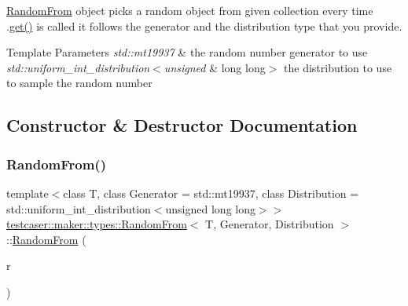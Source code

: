 \mbox{\hyperlink{structtestcaser_1_1maker_1_1types_1_1RandomFrom}{Random\+From}} object picks a random object from given collection every time .\mbox{\hyperlink{structtestcaser_1_1maker_1_1types_1_1RandomFrom_a6f72354c54f49a18de70b057a3b0f04b}{get()}} is called it follows the generator and the distribution type that you provide. 


\begin{DoxyTemplParams}{Template Parameters}
{\em std\+::mt19937} & the random number generator to use \\
\hline
{\em std\+::uniform\+\_\+int\+\_\+distribution$<$unsigned} & long long$>$ the distribution to use to sample the random number \\
\hline
\end{DoxyTemplParams}


\subsection{Constructor \& Destructor Documentation}
\mbox{\label{structtestcaser_1_1maker_1_1types_1_1RandomFrom_a02ca97de6a8f2c6012b1cfa0c4bfd4ce}} 
\subsubsection{\texorpdfstring{RandomFrom()}{RandomFrom()}}
{\footnotesize\ttfamily template$<$class T, class Generator = std\+::mt19937, class Distribution = std\+::uniform\+\_\+int\+\_\+distribution$<$unsigned long long$>$$>$ \\
\mbox{\hyperlink{structtestcaser_1_1maker_1_1types_1_1RandomFrom}{testcaser\+::maker\+::types\+::\+Random\+From}}$<$ T, Generator, Distribution $>$\+::\mbox{\hyperlink{structtestcaser_1_1maker_1_1types_1_1RandomFrom}{Random\+From}} (\begin{DoxyParamCaption}\item[{std\+::vector$<$ T $>$}]{r }\end{DoxyParamCaption})\hspace{0.3cm}{\ttfamily [inline]}}



